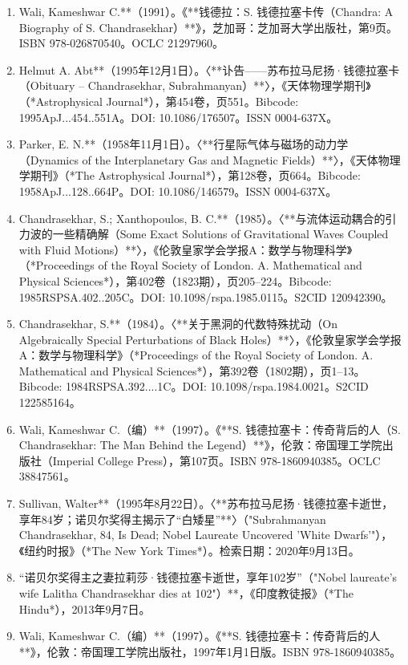 \begin{enumerate}
\item Wali, Kameshwar C.**（1991）。《**钱德拉：S. 钱德拉塞卡传（Chandra: A Biography of S. Chandrasekhar）**》，芝加哥：芝加哥大学出版社，第9页。ISBN 978-026870540。OCLC 21297960。
\item Helmut A. Abt**（1995年12月1日）。〈**讣告——苏布拉马尼扬·钱德拉塞卡（Obituary – Chandrasekhar, Subrahmanyan）**〉，《天体物理学期刊》（*Astrophysical Journal*），第454卷，页551。Bibcode: 1995ApJ...454..551A。DOI: 10.1086/176507。ISSN 0004-637X。
\item Parker, E. N.**（1958年11月1日）。〈**行星际气体与磁场的动力学（Dynamics of the Interplanetary Gas and Magnetic Fields）**〉，《天体物理学期刊》（*The Astrophysical Journal*），第128卷，页664。Bibcode: 1958ApJ...128..664P。DOI: 10.1086/146579。ISSN 0004-637X。
\item Chandrasekhar, S.; Xanthopoulos, B. C.**（1985）。〈**与流体运动耦合的引力波的一些精确解（Some Exact Solutions of Gravitational Waves Coupled with Fluid Motions）**〉，《伦敦皇家学会学报A：数学与物理科学》（*Proceedings of the Royal Society of London. A. Mathematical and Physical Sciences*），第402卷（1823期），页205–224。Bibcode: 1985RSPSA.402..205C。DOI: 10.1098/rspa.1985.0115。S2CID 120942390。
\item Chandrasekhar, S.**（1984）。〈**关于黑洞的代数特殊扰动（On Algebraically Special Perturbations of Black Holes）**〉，《伦敦皇家学会学报A：数学与物理科学》（*Proceedings of the Royal Society of London. A. Mathematical and Physical Sciences*），第392卷（1802期），页1–13。Bibcode: 1984RSPSA.392....1C。DOI: 10.1098/rspa.1984.0021。S2CID 122585164。
\item Wali, Kameshwar C.（编）**（1997）。《**S. 钱德拉塞卡：传奇背后的人（S. Chandrasekhar: The Man Behind the Legend）**》，伦敦：帝国理工学院出版社（Imperial College Press），第107页。ISBN 978-1860940385。OCLC 38847561。
\item Sullivan, Walter**（1995年8月22日）。〈**苏布拉马尼扬·钱德拉塞卡逝世，享年84岁；诺贝尔奖得主揭示了“白矮星”**〉（"Subrahmanyan Chandrasekhar, 84, Is Dead; Nobel Laureate Uncovered 'White Dwarfs'"），《纽约时报》（*The New York Times*）。检索日期：2020年9月13日。
\item “诺贝尔奖得主之妻拉莉莎·钱德拉塞卡逝世，享年102岁”（"Nobel laureate's wife Lalitha Chandrasekhar dies at 102"）**，《印度教徒报》（*The Hindu*），2013年9月7日。
\item Wali, Kameshwar C.（编）**（1997）。《**S. 钱德拉塞卡：传奇背后的人**》，伦敦：帝国理工学院出版社，1997年1月1日版。ISBN 978-1860940385。

\end{enumerate}
